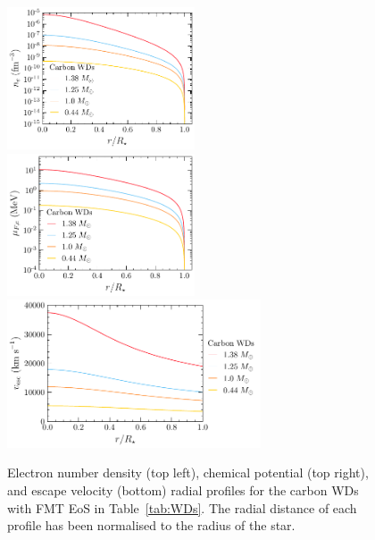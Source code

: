 \begin{figure}[!t]
    \centering
    \includegraphics[width = 0.495\textwidth]{ne_prof.pdf}  
    \includegraphics[width = 0.495\textwidth]{muFe_prof.pdf}  
    \includegraphics[width = 0.67\textwidth]{vesc_prof.pdf}
    \caption{Electron number density (top left), chemical potential (top right), and escape velocity (bottom) radial profiles for the carbon WDs with FMT EoS in Table~\ref{tab:WDs}. The radial distance of each profile has been normalised to the radius of the star.}
    \label{fig:WDradprofs}
\end{figure}


